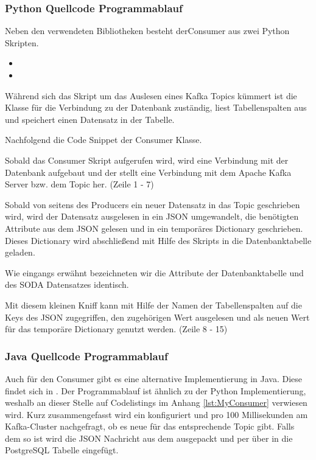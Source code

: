 \subsubsection{Python Quellcode Programmablauf}
Neben den verwendeten Bibliotheken besteht derConsumer aus zwei Python Skripten.

\begin{itemize}
  \item {}
  \item {}
\end{itemize}

Während sich das  Skript um das Auslesen eines Kafka Topics kümmert ist die  Klasse
für die Verbindung zu der Datenbank zuständig, liest Tabellenspalten aus und speichert einen Datensatz in der Tabelle.

Nachfolgend die Code Snippet der Consumer Klasse.



Sobald das Consumer Skript aufgerufen wird, wird eine Verbindung mit der Datenbank
aufgebaut und der  stellt eine Verbindung mit dem Apache Kafka
Server bzw. dem Topic  her.
(Zeile 1 - 7)

Sobald von seitens des Producers ein neuer Datensatz in das Topic  geschrieben wird,
wird der Datensatz ausgelesen in ein \ac{JSON} umgewandelt, die benötigten Attribute aus dem \ac{JSON} gelesen
und in ein temporäres Dictionary geschrieben.\\
Dieses Dictionary wird abschließend mit Hilfe des  Skripts in die
Datenbanktabelle geladen.

Wie eingangs erwähnt bezeichneten wir die Attribute der Datenbanktabelle und des \ac{SODA} Datensatzes identisch.

Mit diesem kleinen \glqq Kniff\grqq{} kann mit Hilfe der Namen der Tabellenspalten
auf die Keys des \ac{JSON} zugegriffen, den zugehörigen Wert ausgelesen und als neuen Wert für das temporäre Dictionary genutzt werden.
(Zeile 8 - 15)

\subsubsection{Java Quellcode Programmablauf}
Auch für den Consumer gibt es eine alternative Implementierung in Java.
Diese findet sich in .
Der Programmablauf ist ähnlich zu der Python Implementierung, weshalb an dieser Stelle auf Codelistings im Anhang \ref{lst:MyConsumer} verwiesen wird.
Kurz zusammengefasst wird ein  konfiguriert und pro 100 Millisekunden am Kafka-Cluster nachgefragt, ob es neue  für das entsprechende Topic gibt.
Falls dem so ist wird die \ac{JSON} Nachricht aus dem  ausgepackt und per  über  in die PostgreSQL Tabelle eingefügt.
\newpage
